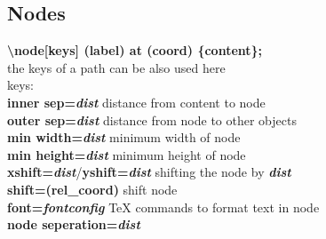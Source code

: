 \documentclass[10pt]{article}
\newcommand{\tikzcmd}[1]{\textbf{#1}}
\newcommand{\tikzparam}[1]{\textbf{\emph{#1}}}
\begin{document}
\begin{multicols}{2}
        \section{Nodes}
        \tikzcmd{\textbackslash node[keys] (label) at (coord) \{content\};}\\
        the keys of a path can be also used here\\
        keys:\\
        \tikzcmd{inner sep=\tikzparam{dist}} distance from content to node\\
        \tikzcmd{outer sep=\tikzparam{dist}} distance from node to other objects\\
        \tikzcmd{min width=\tikzparam{dist}} minimum width of node\\
        \tikzcmd{min height=\tikzparam{dist}} minimum height of node\\
        \tikzcmd{xshift=\tikzparam{dist}}/\tikzcmd{yshift=\tikzparam{dist}} shifting the node by \tikzparam{dist}\\
        \tikzcmd{shift=(rel\_coord)} shift node\\
        \tikzcmd{font=\tikzparam{fontconfig}} TeX commands to format text in node\\
        \tikzcmd{node seperation=\tikzparam{dist}}\\

    \end{multicols}
\end{document}
